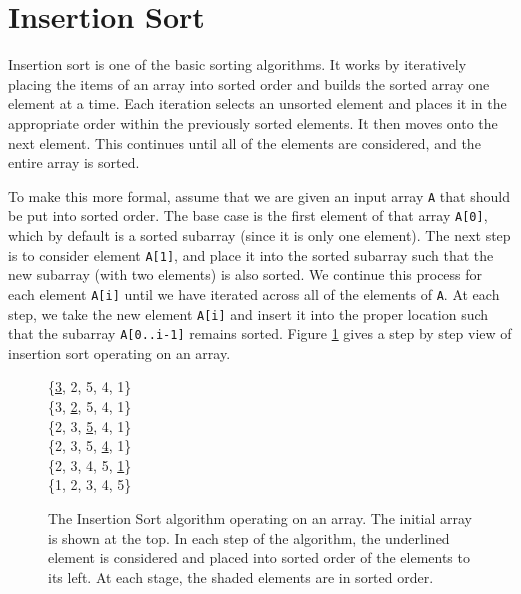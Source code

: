 \section{Insertion Sort}
\label{sec:insertion_sort}

Insertion sort is one of the basic sorting algorithms. It works by iteratively placing the items of an array into sorted order and builds the sorted array one element at a time.  Each iteration selects an unsorted element and places it in the appropriate order within the previously sorted elements. It then moves onto the next element. This continues until all of the elements are considered, and the entire array is sorted.

To make this more formal, assume that we are given an input array \lstinline{A} that should be put into sorted order.  The base case is the first element of that array \lstinline{A[0]}, which by default is a sorted subarray (since it is only one element). The next step is to consider element \lstinline{A[1]}, and place it into the sorted subarray such that the new subarray (with two elements) is also sorted. We continue this process for each element \lstinline{A[i]} until we have iterated across all of the elements of \lstinline{A}. At each step, we take the new element \lstinline{A[i]} and insert it into the proper location such that the subarray \lstinline{A[0..i-1]} remains sorted. Figure \ref{eq:insertion_sort} gives a step by step view of insertion sort operating on an array.
\begin{figure}
\centering
\setlength{\fboxsep}{1pt}
\{\hspace*\fboxsep\underline{3},\hspace*\fboxsep{} 2, 5, 4, 1\} \\
\{\colorbox{black!10}{3,} \underline{2}, 5, 4, 1\} \\
\{\colorbox{black!10}{2, 3,} \underline{5}, 4, 1\} \\
\{\colorbox{black!10}{2, 3, 5,} \underline{4}, 1\} \\
\{\colorbox{black!10}{2, 3, 4, 5,} \underline{1}\} \\
\{\colorbox{black!10}{1, 2, 3, 4, 5}\} \\
\caption{The Insertion Sort algorithm operating on an array.  The initial array is shown at the top.  In each step of the algorithm, the underlined element is considered and placed into sorted order of the elements to its left. At each stage, the shaded elements are in sorted order. }
\label{eq:insertion_sort}
\end{figure}
